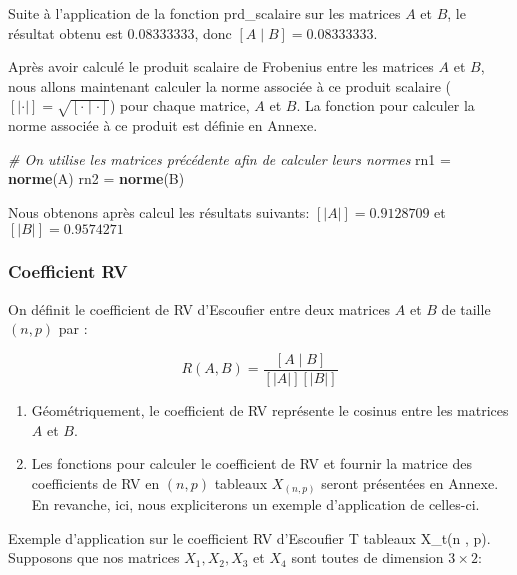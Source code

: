 \documentclass[
]{article}
\newenvironment{Shaded}{\begin{snugshade}}{\end{snugshade}}
\newcommand{\CommentTok}[1]{\textcolor[rgb]{0.56,0.35,0.01}{\textit{#1}}}
\newcommand{\FunctionTok}[1]{\textcolor[rgb]{0.13,0.29,0.53}{\textbf{#1}}}
\newcommand{\NormalTok}[1]{#1}
\newcommand{\OtherTok}[1]{\textcolor[rgb]{0.56,0.35,0.01}{#1}}
\begin{document}
Suite à l'application de la fonction prd\_scalaire sur les matrices
\(A\) et \(B\), le résultat obtenu est 0.08333333, donc
\([A \mid B] = 0.08333333\).

Après avoir calculé le produit scalaire de Frobenius entre les matrices
\(A\) et \(B\), nous allons maintenant calculer la norme associée à ce
produit scalaire
(\(\left[\left| \cdot \right|\right] = \sqrt{ [\cdot \mid \cdot]}\))
pour chaque matrice, \(A\) et \(B\). La fonction pour calculer la norme
associée à ce produit est définie en Annexe.

\begin{Shaded}
\begin{Highlighting}[]
\CommentTok{\# On utilise les matrices précédente afin de calculer leurs normes}
\NormalTok{rn1 }\OtherTok{=} \FunctionTok{norme}\NormalTok{(A)}
\NormalTok{rn2 }\OtherTok{=} \FunctionTok{norme}\NormalTok{(B)}
\end{Highlighting}
\end{Shaded}

Nous obtenons après calcul les résultats suivants:
\(\left[\left| A \right|\right] = 0.9128709\) et
\(\left[\left| B \right|\right] = 0.9574271\)

\hypertarget{coefficient-rv}{%
\subsubsection{Coefficient RV}\label{coefficient-rv}}

On définit le coefficient de RV d'Escoufier entre deux matrices \(A\) et
\(B\) de taille \((n , p)\) par :

\[ R(A ,B) = \frac{[ A \mid B]}{\left[\left| A \right|\right] \left[\left| B \right|\right] } \]

\begin{enumerate}
\def\labelenumi{\alph{enumi})}
\item
  Géométriquement, le coefficient de RV représente le cosinus entre les
  matrices \(A\) et \(B\).
\item
  Les fonctions pour calculer le coefficient de RV et fournir la matrice
  des coefficients de RV en \((n,p)\) tableaux \(X_{(n,p)}\) seront
  présentées en Annexe. En revanche, ici, nous expliciterons un exemple
  d'application de celles-ci.
\end{enumerate}

Exemple d'application sur le coefficient RV d'Escoufier T tableaux
X\_t(n , p).\\
Supposons que nos matrices \(X_1, X_2, X_3\) et \(X_4\) sont toutes de
dimension \(3 \times 2\):
\end{document}
